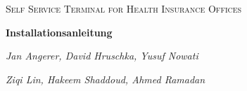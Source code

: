 \documentclass[12, A4]{article}
\date{\today}
\begin{document}
\begin{titlepage} %
\centering

	{\scshape\LARGE Self Service Terminal for Health Insurance Offices\par}
	\vspace{5cm}

	{\huge\bfseries Installationsanleitung\par}
	\vspace{4.5cm}
	{\Large\itshape Jan Angerer, David Hruschka, Yusuf Nowati \par}
	\vspace{0.5cm}
	{\Large\itshape Ziqi Lin, Hakeem Shaddoud, Ahmed Ramadan \par}
	\vfill


	\vfill


\end{titlepage} %




\newpage
\tableofcontents  %
\newpage

\newpage

\newpage

\newpage

\end{document}
